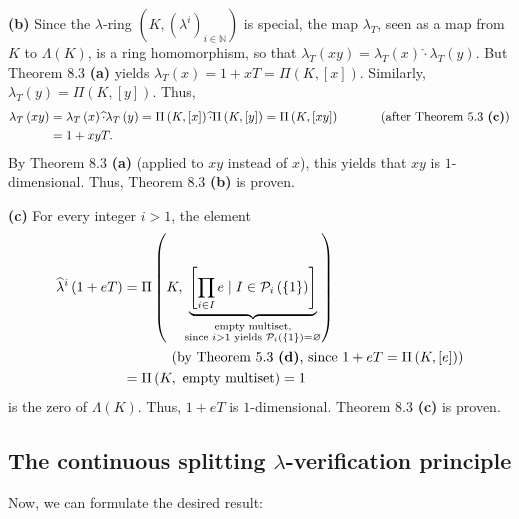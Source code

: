 \documentclass[numbers=enddot,12pt,final,onecolumn,notitlepage]{scrartcl}%
\begin{document}
\textbf{(b)} Since the $\lambda$-ring $\left(  K,\left(  \lambda^{i}\right)
_{i\in\mathbb{N}}\right)  $ is special, the map $\lambda_{T}$, seen as a map
from $K$ to $\Lambda\left(  K\right)  $, is a ring homomorphism, so that
$\lambda_{T}\left(  xy\right)  =\lambda_{T}\left(  x\right)  \widehat{\cdot
}\lambda_{T}\left(  y\right)  $. But Theorem 8.3 \textbf{(a)} yields
$\lambda_{T}\left(  x\right)  =1+xT=\Pi\left(  K,\left[  x\right]  \right)  $.
Similarly, $\lambda_{T}\left(  y\right)  =\Pi\left(  K,\left[  y\right]
\right)  $. Thus,%
\begin{align*}
\lambda_{T}\left(  xy\right)   &  =\lambda_{T}\left(  x\right)  \widehat{\cdot
}\lambda_{T}\left(  y\right)  =\Pi\left(  K,\left[  x\right]  \right)
\widehat{\cdot}\Pi\left(  K,\left[  y\right]  \right)  =\Pi\left(  K,\left[
xy\right]  \right)  \ \ \ \ \ \ \ \ \ \ \left(  \text{after Theorem 5.3
\textbf{(c)}}\right) \\
&  =1+xyT.
\end{align*}
By Theorem 8.3 \textbf{(a)} (applied to $xy$ instead of $x$), this yields that
$xy$ is $1$-dimensional. Thus, Theorem 8.3 \textbf{(b)} is proven.

\textbf{(c)} For every integer $i>1$, the element%
\begin{align*}
\widehat{\lambda}^{i}\left(  1+eT\right)   &  =\Pi\left(
K,\underbrace{\left[  \prod_{i\in I}e\mid I\in\mathcal{P}_{i}\left(  \left\{
1\right\}  \right)  \right]  }_{\substack{\text{empty multiset,}\\\text{since
}i>1\text{ yields }\mathcal{P}_{i}\left(  \left\{  1\right\}  \right)
=\varnothing}}\right) \\
&  \ \ \ \ \ \ \ \ \ \ \left(  \text{by Theorem 5.3 \textbf{(d)}, since
}1+eT=\Pi\left(  K,\left[  e\right]  \right)  \right) \\
&  =\Pi\left(  K,\text{ empty multiset}\right)  =1
\end{align*}
is the zero of $\Lambda\left(  K\right)  $. Thus, $1+eT$ is $1$-dimensional.
Theorem 8.3 \textbf{(c)} is proven.

\subsection{The continuous splitting $\lambda$-verification principle}

Now, we can formulate the desired result:
\end{document}

